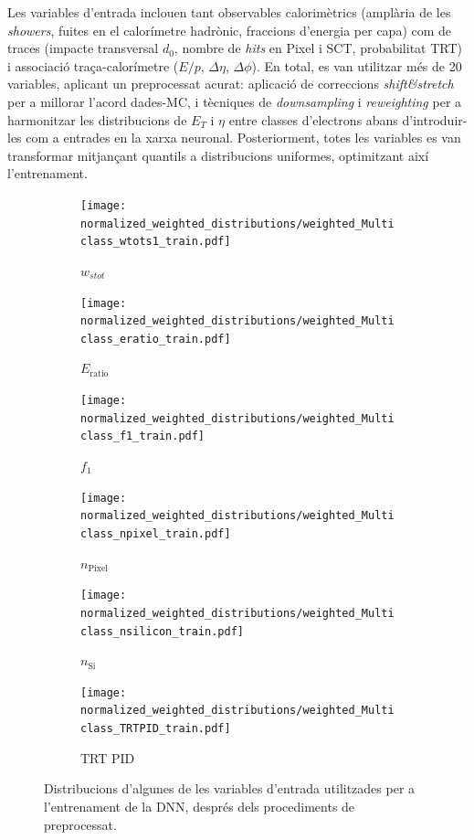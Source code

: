 Les variables d’entrada inclouen tant observables calorimètrics (amplària de les \textit{showers}, fuites en el calorímetre hadrònic, fraccions d’energia per capa) com de traces (impacte transversal $d_0$, nombre de \textit{hits} en Pixel i SCT, probabilitat TRT) i associació traça-calorímetre ($E/p$, $\Delta\eta$, $\Delta\phi$).  
En total, es van utilitzar més de 20 variables, aplicant un preprocessat acurat: aplicació de correccions \textit{shift\&stretch} per a millorar l’acord dades-MC, i tècniques de \textit{downsampling} i \textit{reweighting} per a harmonitzar les distribucions de $E_T$ i $\eta$ entre classes d’electrons abans d’introduir-les com a entrades en la xarxa neuronal.  
Posteriorment, totes les variables es van transformar mitjançant quantils a distribucions uniformes, optimitzant així l’entrenament.

\begin{figure}[htbp]
  \centering
  \begin{subfigure}[b]{0.49\textwidth}
    \centering
    \texttt{[image: normalized\_weighted\_distributions/weighted\_Multiclass\_wtots1\_train.pdf]}
    \caption{$w_{stot}$}
    \label{res:input7}
  \end{subfigure}\hfill
  \begin{subfigure}[b]{0.49\textwidth}
    \centering
    \texttt{[image: normalized\_weighted\_distributions/weighted\_Multiclass\_eratio\_train.pdf]}
    \caption{$E_{\text{ratio}}$}
    \label{res:input8}
  \end{subfigure}
  \vspace{0.45cm}
  \begin{subfigure}[b]{0.49\textwidth}
    \centering
    \texttt{[image: normalized\_weighted\_distributions/weighted\_Multiclass\_f1\_train.pdf]}
    \caption{$f_1$}
    \label{res:input9}
  \end{subfigure}\hfill
  \begin{subfigure}[b]{0.49\textwidth}
    \centering
    \texttt{[image: normalized\_weighted\_distributions/weighted\_Multiclass\_npixel\_train.pdf]}
    \caption{$n_{\text{Pixel}}$}
    \label{res:input11}
  \end{subfigure}
  \vspace{0.45cm}
  \begin{subfigure}[b]{0.49\textwidth}
    \centering
    \texttt{[image: normalized\_weighted\_distributions/weighted\_Multiclass\_nsilicon\_train.pdf]}
    \caption{$n_{\text{Si}}$}
    \label{res:input12}
  \end{subfigure}\hfill
  \begin{subfigure}[b]{0.49\textwidth}
    \centering
    \texttt{[image: normalized\_weighted\_distributions/weighted\_Multiclass\_TRTPID\_train.pdf]}
    \caption{TRT PID}
    \label{res:input18}
  \end{subfigure}
  \caption{Distribucions d’algunes de les variables d’entrada utilitzades per a l’entrenament de la DNN, després dels procediments de preprocessat.}
  \label{res:dnn_inputs_distributions_B}
\end{figure}


